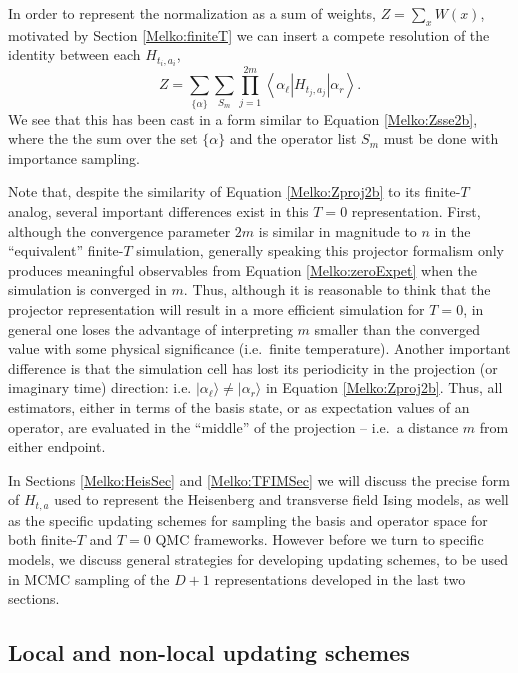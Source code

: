 \documentclass[vecphys]{svmult}
\begin{document}
In order to represent the normalization as a sum of weights, $Z = \sum_x W(x)$, motivated by Section \ref{Melko:finiteT} we can insert a compete resolution of the identity between each $H_{t_i,a_i}$,
\begin{equation}
Z=\sum_{ \{ \alpha\} } \sum_{S_m} 
\prod_{j=1}^{2m}   \left\langle{\alpha_{\ell}  \left| H_{t_j,a_j}\right| \alpha_r  }\right\rangle.
 \label{Melko:Zproj2b}
\end{equation}
We see that this has been cast in a form similar to Equation \ref{Melko:Zsse2b}, where the  the sum over the set $\{ \alpha \}$ and the operator list $S_m$ must be done with importance sampling. 

Note that, despite the similarity of Equation \ref{Melko:Zproj2b} to its finite-$T$ analog, several important differences exist in this $T=0$ representation.  First, although the convergence parameter $2m$ is similar in magnitude to $n$ in the ``equivalent'' finite-$T$ simulation, 
generally speaking this projector formalism only produces meaningful observables from Equation \ref{Melko:zeroExpet} when the simulation is converged in $m$.  Thus, although it is reasonable to think that the projector representation will result in a more efficient simulation for $T=0$, in general one loses the advantage of interpreting $m$ smaller than the converged value with some physical significance (i.e.~finite temperature).
Another important difference is that the simulation cell has lost its periodicity in the projection (or imaginary time) direction: i.e. $| \alpha_{\ell} \rangle \neq | \alpha_r \rangle$ in Equation \ref{Melko:Zproj2b}.  Thus, all estimators, either in terms of the basis state, or as expectation values of an operator, are evaluated in the ``middle'' of the projection -- i.e.~a distance $m$ from either endpoint.

In Sections \ref{Melko:HeisSec} and \ref{Melko:TFIMSec} we will discuss the precise form of $H_{t,a}$ used to represent the Heisenberg and transverse field Ising models, as well as the specific updating schemes for sampling the basis and operator space for both finite-$T$ and $T=0$ QMC frameworks.  However before we turn to specific models, we discuss general strategies for developing updating schemes, to be used in MCMC sampling of the $D+1$ representations developed in the last two sections.


\subsection{Local and non-local updating schemes} \label{Melko:updates}
\end{document}
